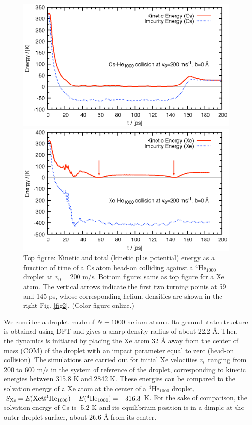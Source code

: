 			\begin{figure}[!]
				\centerline{\includegraphics[width=0.90\linewidth,clip]{fig3-Cs-He}} 
				\centerline{\includegraphics[width=0.90\linewidth,clip]{fig3-Xe-He}}
				\caption{\label{fig3}Top figure: Kinetic and total (kinetic plus potential) energy as a function of time  of a Cs atom head-on colliding against a  $^4$He$_{1000}$ droplet at  $v_0 = 200$ m/s. Bottom figure: same as top figure for a Xe atom. The vertical arrows indicate the first two turning points at 59 and 145 ps, whose corresponding helium densities are shown in the right Fig. \ref{fig2}. (Color figure online.)}
			\end{figure}

We consider a droplet made of $N=1000$ helium atoms. 
Its ground state structure is obtained using DFT and gives a sharp-density  radius of about 22.2 \AA{}. 
Then the dynamics is initiated by placing the Xe atom 
32 \AA{} away from the center of mass (COM) of the droplet
with an impact parameter equal to zero (head-on collision).
The simulations are carried out 
for initial Xe velocities  $v_0$ ranging from 200 to  600 m/s in the system of reference of the droplet, corresponding
to kinetic energies between  315.8 K and  2842 K. 
These energies can be compared to
the solvation energy of a Xe atom at the center of a $^4$He$_{1000}$ droplet, 
$S_{{\rm Xe}} = E({\rm Xe}@^4{\rm He}_{1000}) - E(^4{\rm He}_{1000}) = -316.3$ K.
For the sake of comparison, the solvation energy of Cs is -5.2 K and its equilibrium position is  in a dimple at the outer droplet surface, 
about 26.6 \AA{} from its center. 

